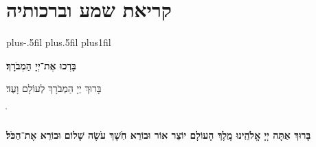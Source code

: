 \documentclass[twoside, openany, parskip=half, 11pt]{book}
\begin{document}
\chapter[שחרית לחול]{קריאת שמע וברכותיה}
\newcommand{\barachu}{
\begin{minipage}{0.8\textwidth}
\leftskip=0pt plus-.5fil
\rightskip=0pt plus.5fil
\parfillskip=0pt plus1fil
\begin{large}

\shatz
\begin{Large}\textbf{בָּרְכוּ אֶת־יְיָ הַמְבֹרָךְ׃}\end{Large}
\end{large}

\vspace{12pt}

\shatzvkahal
בָּרוּךְ יְיָ הַמְבֹרָךְ לְעוֹלָם וָעֶד׃
\end{minipage}
ֺֺ%

%
}


\barachu

\textbf{
בָּרוּךְ אַתָּה יְיָ אֱלֹהֵֽינוּ מֶֽלֶךְ הָעוֹלָם יוֹצֵר אוֹר וּבוֹרֵא חֹֽשֶׁךְ עֹשֶׂה שָׁלוֹם וּבוֹרֵא אֶת־הַכֹּל׃
}

\newcommand{\hameir}{
\firstword{הַמֵּאִיר}
לָאָֽרֶץ וְלַדָּרִים עָלֶֽיהָ בְּרַחֲמִים וּבְטוּבוֹ מְחַדֵּשׁ בְּכׇל־יוֹם תָּמִיד מַעֲשֵׂה בְרֵאשִׁית׃ \source{תהלים קד}מָה־רַבּ֬וּ מַעֲשֶׂ֨יךָ ׀ יְיָ֗ כֻּ֭לָּם בְּחׇכְמָ֣ה עָשִׂ֑יתָ מָלְאָ֥ה הָ֝אָ֗רֶץ קִנְיָנֶֽךָ׃ הַמֶּֽלֶךְ הַמְרוֹמָם לְבַדּוֹ מֵאָז הַמְשֻׁבָּח וְהַמְפֹאָר וְהַמִּתְנַשֵּׂא מִימוֹת עוֹלָם׃ אֱלֹהֵי עוֹלָם בְּרַחֲמֶיךָ הָרַבִּים רַחֵם עָלֵינוּ אֲדוֹן עֻזֵּֽנוּ צוּר מִשְׂגַּבֵּנוּ מָגֵן יִשְׁעֵֽנוּ מִשְׂגָּב בַּעֲדֵֽנוּ׃ אֵ֗ל בָּ֗רוּךְ גְּ֗דוֹל דֵּ֗עָה הֵ֗כִין וּ֗פָעַל זׇ֗הֳרֵי חַ֗מָּה ט֗וֹב יָ֗צַר כָּ֗בוֹד לִ֗שְׁמוֹ מְ֗אוֹרוֹת נָ֗תַן סְ֗בִיבוֹת עֻ֗זּוֹ פִּ֗נּוֹת צְ֗בָאָיו קְ֗דוֹשִׁים ר֗וֹמֲמֵי שַׁ֗דַּי תָּ֗מִיד מְסַפְּרִים כְּבוֹד־אֵל וּקְדֻשָׁתוֹ׃ תִּתְבָּרַךְ יְיָ אֱלֹהֵֽינוּ עַל־שֶׁבַח מַעֲשֵׂי יָדֶֽיךָ וְעַל־מְאֽוֹרֵי אוֹר שֶׁעָשִֽׂיתָ יְפָאֲרֽוּךָ סֶּֽלָה׃
}
\end{document}
